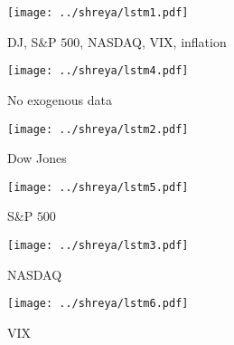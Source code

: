 \documentclass[12pt]{article}
\begin{document}
    \begin{minipage}{0.5\textwidth}
        \begin{figure}[H]
            \centering
            \caption{DJ, S\&P $500$, NASDAQ, VIX, inflation}
            \texttt{[image: ../shreya/lstm1.pdf]}
            \label{fig:LSTM-shreya-1}
        \end{figure}
    \end{minipage}
    \begin{minipage}{0.5\textwidth}
        \begin{figure}[H]
            \centering
            \caption{No exogenous data}
            \texttt{[image: ../shreya/lstm4.pdf]}
            \label{fig:LSTM-shreya-4}
        \end{figure}
    \end{minipage}

    \begin{minipage}{0.5\textwidth}
        \begin{figure}[H]
            \centering
            \caption{Dow Jones}
            \texttt{[image: ../shreya/lstm2.pdf]}
            \label{fig:LSTM-shreya-2}
        \end{figure}
    \end{minipage}
    \begin{minipage}{0.5\textwidth}
        \begin{figure}[H]
            \centering
            \caption{S\&P $500$}
            \texttt{[image: ../shreya/lstm5.pdf]}
            \label{fig:LSTM-shreya-5}
        \end{figure}
    \end{minipage}

    \begin{minipage}{0.5\textwidth}
        \begin{figure}[H]
            \centering
            \caption{NASDAQ}
            \texttt{[image: ../shreya/lstm3.pdf]}
            \label{fig:LSTM-shreya-3}
        \end{figure}
    \end{minipage}
    \begin{minipage}{0.5\textwidth}
        \begin{figure}[H]
            \centering
            \caption{VIX}
            \texttt{[image: ../shreya/lstm6.pdf]}
            \label{fig:LSTM-shreya-6}
        \end{figure}
    \end{minipage}
\end{document}

